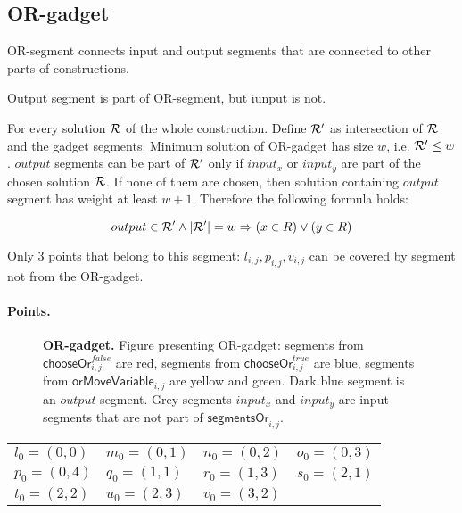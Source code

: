 \subsection{OR-gadget}

OR-segment connects input and output segments
that are connected to other parts of
constructions.

Output segment is part of OR-segment, but iunput is not.

For every solution $\mathcal{R}$ of the whole construction.
Define $\mathcal{R}'$ as intersection of $\mathcal{R}$ and the gadget segments.
Minimum solution of OR-gadget has size $w$, i.e. $\mathcal{R}' \le w$.
$output$ segments can be part of $\mathcal{R}'$ only 
if $input_x$ or $input_y$ are part of the chosen solution $\mathcal{R}$.
If none of them are chosen, then solution
containing $output$ segment has weight at least $w+1$.
Therefore the following formula holds:

$$output \in \mathcal{R}' \land |\mathcal{R}'| = w \Rightarrow (x \in R) \lor (y \in R) $$

Only 3 points that belong to this segment: $l_{i,j}, p_{i,j}, v_{i,j}$
can be covered by segment not from the OR-gadget.

\paragraph{Points.}

\newcommand{\chooseOr}[3]{\mathsf{chooseOr}^{#1}_{#2,#3}}
\newcommand{\orMoveVariable}[2]{\mathsf{orMoveVariable}_{#1,#2}}
\newcommand{\pointsOr}[2]{\mathsf{pointsOr}_{#1,#2}}
\newcommand{\segmentsOr}[2]{\mathsf{segmentsOr}_{#1,#2}}

\begin{figure}[h]
\centering
\def\svgwidth{0.5\columnwidth}

\caption{
	\textbf{OR-gadget.} Figure presenting OR-gadget:
	segments from $\chooseOr{false}{i}{j}$ are red,
	segments from $\chooseOr{true}{i}{j}$ are blue,
	segments from $\orMoveVariable{i}{j}$ are yellow and green.
	Dark blue segment is an $output$ segment.
	Grey segments $input_x$ and $input_y$ are input segments that
	are not part of $\segmentsOr{i}{j}$.
}
\label{fig:apx_or_gadget}
\end{figure}

\begin{center}
	\begin{tabular}{ l l l l}

		$l_0 = (0, 0)$ &
		$m_0 = (0, 1)$ &
		$n_0 = (0, 2)$ &
		$o_0 = (0, 3)$ \\
		$p_0 = (0, 4)$ &
		$q_0 = (1, 1)$ &
		$r_0 = (1, 3)$ &
		$s_0 = (2, 1)$ \\
		$t_0 = (2, 2)$ &
		$u_0 = (2, 3)$ &
		$v_0 = (3, 2)$ &
	\end{tabular}
\end{center}


